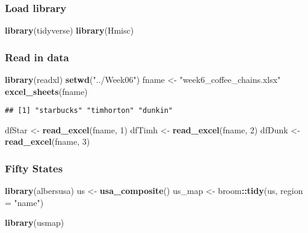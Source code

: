 \documentclass[]{article}
\title{}
\author{}
\date{}
\newenvironment{Shaded}{\begin{snugshade}}{\end{snugshade}}
\newcommand{\KeywordTok}[1]{\textcolor[rgb]{0.13,0.29,0.53}{\textbf{#1}}}
\newcommand{\DataTypeTok}[1]{\textcolor[rgb]{0.13,0.29,0.53}{#1}}
\newcommand{\DecValTok}[1]{\textcolor[rgb]{0.00,0.00,0.81}{#1}}
\newcommand{\StringTok}[1]{\textcolor[rgb]{0.31,0.60,0.02}{#1}}
\newcommand{\OperatorTok}[1]{\textcolor[rgb]{0.81,0.36,0.00}{\textbf{#1}}}
\newcommand{\NormalTok}[1]{#1}
\begin{document}
\subsubsection{Load library}\label{load-library}

\begin{Shaded}
\begin{Highlighting}[]
\KeywordTok{library}\NormalTok{(tidyverse)}
\KeywordTok{library}\NormalTok{(Hmisc)}
\end{Highlighting}
\end{Shaded}

\subsubsection{Read in data}\label{read-in-data}

\begin{Shaded}
\begin{Highlighting}[]
\KeywordTok{library}\NormalTok{(readxl)}
\KeywordTok{setwd}\NormalTok{(}\StringTok{"../Week06"}\NormalTok{)}
\NormalTok{fname <-}\StringTok{ "week6_coffee_chains.xlsx"}
\KeywordTok{excel_sheets}\NormalTok{(fname)}
\end{Highlighting}
\end{Shaded}

\begin{verbatim}
## [1] "starbucks" "timhorton" "dunkin"
\end{verbatim}

\begin{Shaded}
\begin{Highlighting}[]
\NormalTok{dfStar <-}\StringTok{ }\KeywordTok{read_excel}\NormalTok{(fname, }\DecValTok{1}\NormalTok{)}
\NormalTok{dfTimh <-}\StringTok{ }\KeywordTok{read_excel}\NormalTok{(fname, }\DecValTok{2}\NormalTok{)}
\NormalTok{dfDunk <-}\StringTok{ }\KeywordTok{read_excel}\NormalTok{(fname, }\DecValTok{3}\NormalTok{)}
\end{Highlighting}
\end{Shaded}

\subsubsection{Fifty States}\label{fifty-states}

\begin{Shaded}
\begin{Highlighting}[]
\KeywordTok{library}\NormalTok{(albersusa)}
\NormalTok{us      <-}\StringTok{ }\KeywordTok{usa_composite}\NormalTok{()}
\NormalTok{us_map  <-}\StringTok{ }\NormalTok{broom}\OperatorTok{::}\KeywordTok{tidy}\NormalTok{(us, }\DataTypeTok{region =} \StringTok{"name"}\NormalTok{)}

\KeywordTok{library}\NormalTok{(usmap)}
\end{Highlighting}
\end{Shaded}
\end{document}
